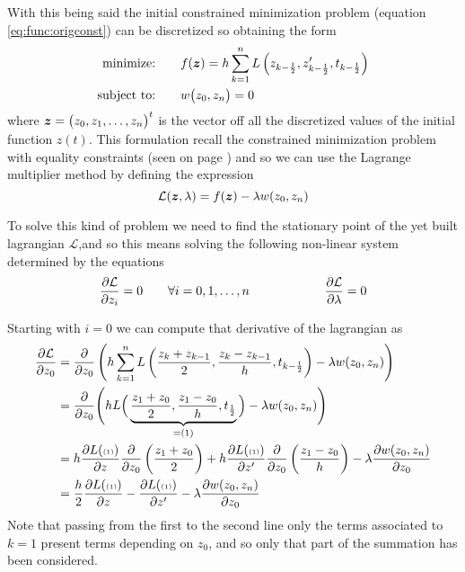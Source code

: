 With this being said the initial constrained minimization problem (equation \ref{eq:func:origconst}) can be discretized so obtaining the form
\begin{equation} \label{eq:func:discretized}
	\begin{aligned} 
		\textrm{minimize:}& \qquad f(\boldsymbol{z}) = h \sum_{k=1}^{n} L  \left( z_{k-\frac 1 2}, z_{k-\frac 1 2}', t_{k-\frac 1 2} \right) \\
		\textrm{subject to:}& \qquad w\big(z_0,z_n \big) = 0
	\end{aligned}
\end{equation}
where $\boldsymbol{z} = \big(z_0,z_1,\dots,z_n\big)^t$ is the vector off all the discretized values of the initial function $z(t)$. This formulation recall the constrained minimization problem with equality constraints (seen on page \pageref{sec:min:constrainedmin}) and so we can use the Lagrange multiplier method by defining the expression
\[ \mathcal L   (\boldsymbol{z},\lambda) = f(\boldsymbol{z}) - \lambda w(z_0,z_n) \]

To solve this kind of problem we need to find the stationary point of the yet built lagrangian $\mathcal L  $,and so this means solving the following non-linear system determined by the equations
\[ \frac{\partial \mathcal L  }{\partial z_i} = 0 \qquad \forall i = 0,1,\dots,n \qquad \qquad \qquad \frac{\partial \mathcal L  }{\partial \lambda} = 0 \]

Starting with $i=0$ we can compute that derivative of the lagrangian as
\begin{align*}
	\frac{\partial \mathcal L  }{\partial z_0} &= \frac{\partial }{\partial z_0} \left(h \sum_{k=1}^{n} L  \left(\frac{z_k + z_{k-1}}{2},  \frac{z_k - z_{k-1}}{h}  , t_{k-\frac 1 2}   \right) - \lambda w(z_0,z_n) \right) \\
	&= \frac{\partial }{\partial z_0} \Bigg(h L  \Big(\underbrace{\frac{z_1 + z_0}{2},  \frac{z_1 - z_0}{h}  , t_{\frac 1 2}}_{ = (1) }   \Big) - \lambda w(z_0,z_n) \Bigg) \\
	& = h \frac{\partial L ({\scriptscriptstyle (1) })}{\partial z} \frac{\partial }{\partial z_0}\left( \frac{z_1 + z_0}{2} \right) + h \frac{\partial L ({\scriptscriptstyle (1) })}{\partial z'} \frac{\partial }{\partial z_0}\left( \frac{z_1 -  z_0}{h} \right) - \lambda \frac{\partial w(z_0,z_n)}{\partial z_0} \\
	& =  \frac h 2 \frac{\partial L ({\scriptscriptstyle (1) })}{\partial z} - \frac{\partial L ({\scriptscriptstyle (1) })}{\partial z'} - \lambda \frac{\partial w(z_0,z_n)}{\partial z_0} \\
\end{align*}
Note that passing from the first to the second line only the terms associated to $k=1$ present terms depending on $z_0$, and so only that part of the summation has been considered.


